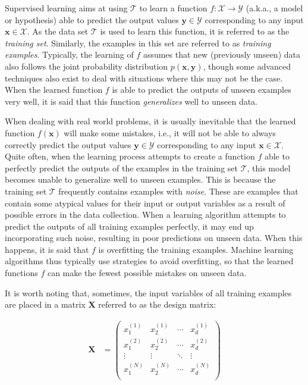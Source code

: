 Supervised learning aims at using $\mathcal{T}$ to learn a function $f: \mathcal{X} \rightarrow \mathcal{Y}$ (a.k.a., a model or hypothesis) able to predict the output values $\mathbf{y} \in \mathcal{Y}$ corresponding to any input $\mathbf{x} \in \mathcal{X}$. As the data set $\mathcal{T}$ is used to learn this function, it is referred to as the \textit{training set}. Similarly, the examples in this set are referred to as \textit{training examples}. Typically, the learning of $f$ assumes that new (previously unseen) data also follows the joint probability distribution $p(\mathbf{x},\mathbf{y})$, though some advanced techniques also exist to deal with situations where this may not be the case. When the learned function $f$ is able to predict the outputs of unseen examples very well, it is said that this function \textit{generalizes} well to unseen data. 

When dealing with real world problems, it is usually inevitable that the learned function $f(\mathbf{x})$ will make some mistakes, i.e., it will not be able to always correctly predict the output values  $\mathbf{y} \in \mathcal{Y}$ corresponding to any input $\mathbf{x} \in \mathcal{X}$. Quite often, when the learning process attempts to create a function $f$ able to perfectly predict the outputs of the examples in the training set $\mathcal{T}$, this model becomes unable to generalize well to unseen examples. This is because the training set $\mathcal{T}$ frequently contains examples with \textit{noise}. These are examples that contain some atypical values for their input or output variables as a result of possible errors in the data collection. When a learning algorithm attempts to predict the outputs of all training examples perfectly, it may end up incorporating such noise, resulting in poor predictions on unseen data. When this happens, it is said that $f$ is overfitting the training examples. Machine learning algorithms thus typically use strategies to avoid overfitting, so that the learned functions $f$ can make the fewest possible mistakes on unseen data.  

It is worth noting that, sometimes, the input variables of all training examples are placed in a matrix $\mathbf{X}$ referred to as the design matrix:

\begin{align}
    \mathbf{X} &= \begin{pmatrix}
           x^{(1)}_{1} & x^{(1)}_{2} & \cdots & x^{(1)}_{d} \\
           x^{(2)}_{1} & x^{(2)}_{2} & \cdots & x^{(2)}_{d} \\
           \vdots & \vdots & \ddots & \vdots \\
		   x^{(N)}_{1} & x^{(N)}_{2} & \cdots & x^{(N)}_{d} \\
         \end{pmatrix}
  \end{align}

